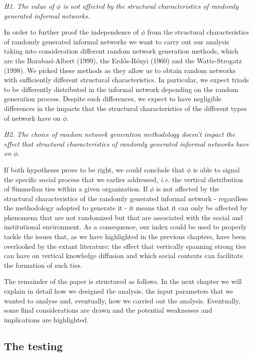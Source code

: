 \documentclass{article}
\begin{document}
\bigskip
\emph{H1. The value of $\phi$ is not affected by the structural characteristics of randomly generated informal networks.}
\bigskip

In order to further proof the independence of $\phi$ from the structural characteristics of randomly generated informal networks we want to carry out our analysis taking into consideration different random network generation methods, which are the Barabasi-Albert (1999), the Erdős-Rényi (1960) and the Watts-Strogatz (1998). We picked these methods as they allow us to obtain random networks with sufficiently different structural characteristics. In particular, we expect triads to be differently distributed in the informal network depending on the random generation process. Despite such differences, we expect to have negligible differences in the impacts that the structural characteristics of the different types of network have on $\phi$.

\bigskip
\emph{H2. The choice of random network generation methodology doesn't impact the effect that structural characteristics of randomly generated informal networks have on $\phi$}.
\bigskip

If both hypotheses prove to be right, we could conclude that $\phi$ is able to signal the specific social process that we earlier addressed, \emph{i.e.} the vertical distribution of Simmelian ties within a given organization. If $\phi$ is not affected by the structural characteristics of the randomly generated informal network - regardless the methodology adopted to generate it - it means that it can only be affected by phenomena that are not randomized but that are associated with the social and institutional environment. As a consequence, our index could be used to properly tackle the issues that, as we have highlighted in the previous chapters, have been overlooked by the extant literature: the effect that vertically spanning strong ties can have on vertical knowledge diffusion and which social contexts can facilitate the formation of such ties. 

The remainder of the paper is structured as follows. In the next chapter we will explain in detail how we designed the analysis, the input parameters that we wanted to analyse and, eventually, how we carried out the analysis. Eventually, some final considerations are drawn and the potential weaknesses and implications are highlighted.




\subsection{The testing}
\end{document}
